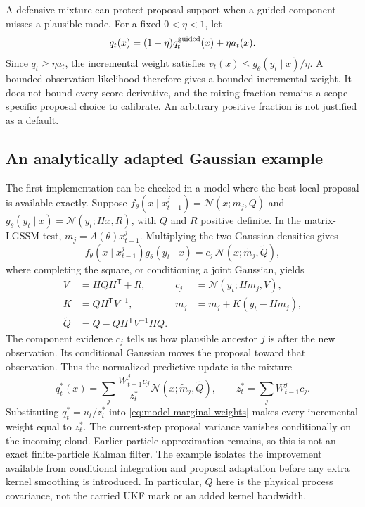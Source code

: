 \documentclass[11pt]{article}
\begin{document}
A defensive mixture can protect proposal support when a guided component
misses a plausible mode. For a fixed $0<\eta<1$, let
\begin{equation}
 q_t(x)=(1-\eta)q_t^{\rm guided}(x)+\eta a_t(x).
 \label{eq:defensive-mixture}
\end{equation}
Since $q_t\ge\eta a_t$, the incremental weight satisfies
$v_t(x)\le g_\theta(y_t\mid x)/\eta$. A bounded observation likelihood
therefore gives a bounded incremental weight. It does not bound every score
derivative, and the mixing fraction remains a scope-specific proposal choice
to calibrate. An arbitrary positive fraction is not justified as a default.

\subsection{An analytically adapted Gaussian example}

The first implementation can be checked in a model where the best local
proposal is available exactly. Suppose
$f_\theta(x\mid x_{t-1}^j)=\mathcal N(x;m_j,Q)$ and
$g_\theta(y_t\mid x)=\mathcal N(y_t;Hx,R)$, with $Q$ and $R$ positive
definite. In the matrix-LGSSM test, $m_j=A(\theta)x_{t-1}^j$.
Multiplying the two Gaussian densities gives
\begin{equation}
 f_\theta(x\mid x_{t-1}^j)g_\theta(y_t\mid x)
 =c_j\,\mathcal N(x;\widetilde m_j,\widetilde Q),
 \label{eq:adapted-component-product}
\end{equation}
where completing the square, or conditioning a joint Gaussian, yields
\begin{align}
 V&=HQH^\mathsf T+R,& c_j&=\mathcal N(y_t;Hm_j,V),\\
 K&=QH^\mathsf T V^{-1},&
 \widetilde m_j&=m_j+K(y_t-Hm_j),\\
 \widetilde Q&=Q-QH^\mathsf T V^{-1}HQ.&
 \label{eq:adapted-component-parameters}
\end{align}
The component evidence $c_j$ tells us how plausible ancestor $j$ is after the
new observation. Its conditional Gaussian moves the proposal toward that
observation. Thus the normalized predictive update is the mixture
\begin{equation}
 q_t^*(x)=\sum_j\frac{W_{t-1}^jc_j}{z_t^*}
                   \mathcal N(x;\widetilde m_j,\widetilde Q),
 \qquad z_t^*=\sum_j W_{t-1}^jc_j.
 \label{eq:fully-adapted-mixture}
\end{equation}
Substituting $q_t^*=u_t/z_t^*$ into
\eqref{eq:model-marginal-weights} makes every incremental weight equal to
$z_t^*$. The current-step proposal variance vanishes conditionally on the
incoming cloud. Earlier particle approximation remains, so this is not an
exact finite-particle Kalman filter. The example isolates the improvement
available from conditional integration and proposal adaptation before any
extra kernel smoothing is introduced. In particular, $Q$ here is the physical
process covariance, not the carried UKF mark or an added kernel bandwidth.
\end{document}
